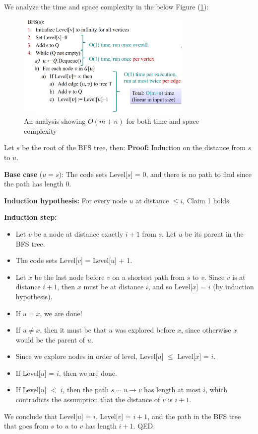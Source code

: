   \newpage

We analyze the time and space complexity in the below Figure (\ref{fig:bfs_q_ana}):

\begin{figure}[h]
    \begin{center}
      \includegraphics[height=2in]{./Sections/graphs/bfs_q_ana.png}
    \end{center}
     \caption{An analysis showing $O(m+n)$ for both time and space complexity}\label{fig:bfs_q_ana}
  \end{figure}
  \begin{Proof}
    Let $s$ be the root of the BFS tree, then:
    \textbf{Proof:} Induction on the distance from $s$ to $u$.
    
    \textbf{Base case} ($u = s$): The code sets Level[$s$] = 0, and there is no path to find since the path has length 0.
    
    \textbf{Induction hypothesis:} For every node $u$ at distance $\leq i$, Claim 1 holds.
    
    \textbf{Induction step:}
    \begin{itemize}
        \item Let $v$ be a node at distance exactly $i + 1$ from $s$. Let $u$ be its parent in the BFS tree.
        \item The code sets Level[$v$] = Level[$u$] + 1.
        \item Let $x$ be the last node before $v$ on a shortest path from $s$ to $v$. Since $v$ is at distance $i + 1$, then $x$ must be at distance $i$, and so Level[$x$] = $i$ (by induction hypothesis).
        \item If $u = x$, we are done!
        \item If $u \neq x$, then it must be that $u$ was explored before $x$, since otherwise $x$ would be the parent of $u$.
        \item Since we explore nodes in order of level, Level[$u$] $\leq$ Level[$x$] = $i$.
        \item If Level[$u$] = $i$, then we are done.
        \item If Level[$u$] $<$ $i$, then the path $s \sim u \to v$ has length at most $i$, which contradicts the assumption that the distance of $v$ is $i + 1$.
    \end{itemize}
    
    We conclude that Level[$u$] = $i$, Level[$v$] = $i + 1$, and the path in the BFS tree that goes from $s$ to $u$ to $v$ has length $i + 1$. QED.
    \end{Proof}
    
